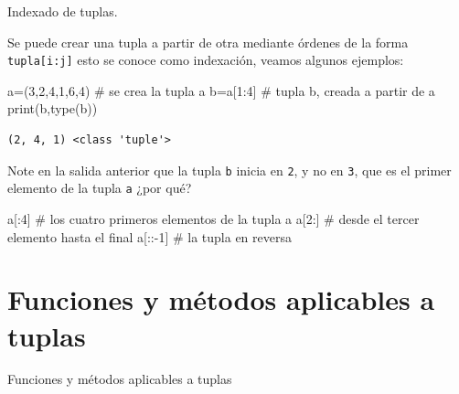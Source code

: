 \documentclass[
  ignorenonframetext,
  aspectratio=169,
  spanish,
]{beamer}
\newenvironment{Shaded}{\begin{snugshade}}{\end{snugshade}}
\newcommand{\BuiltInTok}[1]{\textcolor[rgb]{0.00,0.23,0.31}{#1}}
\newcommand{\CommentTok}[1]{\textcolor[rgb]{0.37,0.37,0.37}{#1}}
\newcommand{\DecValTok}[1]{\textcolor[rgb]{0.68,0.00,0.00}{#1}}
\newcommand{\NormalTok}[1]{\textcolor[rgb]{0.00,0.23,0.31}{#1}}
\newcommand{\OperatorTok}[1]{\textcolor[rgb]{0.37,0.37,0.37}{#1}}
\begin{document}
\begin{frame}[fragile]{Indexado de tuplas.}
\label{indexado-de-tuplas.}

Se puede crear una tupla a partir de otra mediante órdenes de la forma
\texttt{tupla{[}i:j{]}} esto se conoce como indexación, veamos algunos
ejemplos:

\begin{Shaded}
\begin{Highlighting}[]
\NormalTok{a}\OperatorTok{=}\NormalTok{(}\DecValTok{3}\NormalTok{,}\DecValTok{2}\NormalTok{,}\DecValTok{4}\NormalTok{,}\DecValTok{1}\NormalTok{,}\DecValTok{6}\NormalTok{,}\DecValTok{4}\NormalTok{) }\CommentTok{\# se crea la tupla a }
\NormalTok{b}\OperatorTok{=}\NormalTok{a[}\DecValTok{1}\NormalTok{:}\DecValTok{4}\NormalTok{] }\CommentTok{\# tupla b, creada a partir de a }
\BuiltInTok{print}\NormalTok{(b,}\BuiltInTok{type}\NormalTok{(b))}
\end{Highlighting}
\end{Shaded}

\begin{verbatim}
(2, 4, 1) <class 'tuple'>
\end{verbatim}

Note en la salida anterior que la tupla \texttt{b} inicia en \texttt{2},
y no en \texttt{3}, que es el primer elemento de la tupla \texttt{a}
¿por qué?

\begin{Shaded}
\begin{Highlighting}[]
\NormalTok{a[:}\DecValTok{4}\NormalTok{]    }\CommentTok{\# los cuatro primeros elementos de la tupla a}
\NormalTok{a[}\DecValTok{2}\NormalTok{:]    }\CommentTok{\# desde el tercer elemento hasta el final }
\NormalTok{a[::}\OperatorTok{{-}}\DecValTok{1}\NormalTok{]  }\CommentTok{\# la tupla en reversa  }
\end{Highlighting}
\end{Shaded}
\end{frame}

\section{Funciones y métodos aplicables a
tuplas}\label{sec-funcionesAplicablesATuplas}

\begin{frame}{Funciones y métodos aplicables a tuplas}
\end{frame}
\end{document}
